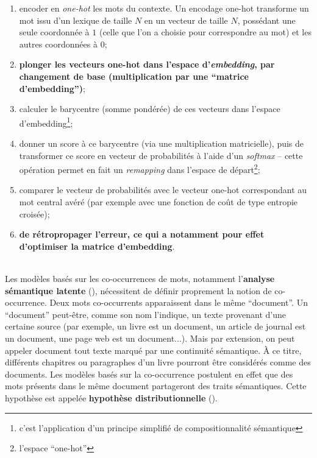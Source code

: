 \documentclass[french]{article}
\begin{document}
				\begin{enumerate}[label=(\roman*)]
					\item encoder en \textit{one-hot} les mots du contexte. Un encodage one-hot transforme un mot issu d'un lexique de taille $N$ en un vecteur de taille $N$, possédant une seule coordonnée à $1$ (celle que l'on a choisie pour correspondre au mot) et les autres coordonnées à $0$;
					\item \textbf{plonger les vecteurs one-hot dans l'espace d'\textit{embedding}, par changement de base (multiplication par une ``matrice d'embedding'')};
					\item calculer le barycentre (somme pondérée) de ces vecteurs dans l'espace d'embedding\footnote{c'est l'application d'un principe simplifié de compositionnalité sémantique};
					\item donner un score à ce barycentre (via une multiplication matricielle), puis de transformer ce score en vecteur de probabilités à l'aide d'un \textit{softmax} -- cette opération permet en fait un \textit{remapping} dans l'espace de départ\footnote{l'espace ``one-hot''};
					\item comparer le vecteur de probabilités avec le vecteur one-hot correspondant au mot central avéré (par exemple avec une fonction de coût de type entropie croisée);
					\item \textbf{de rétropropager l'erreur, ce qui a notamment pour effet d'optimiser la matrice d'embedding}.
				\end{enumerate}~\\
			
			
			Les modèles basés sur les co-occurrences de mots, notamment l'\textbf{analyse sémantique latente} (\cite{landauer1997,deerwester1990}), nécessitent de définir proprement la notion de co-occurrence. Deux mots co-occurrents apparaissent dans le même ``document''. Un ``document'' peut-être, comme son nom l'indique, un texte provenant d'une certaine source (par exemple, un livre est un document, un article de journal est un document, une page web est un document...). Mais par extension, on peut appeler document tout texte marqué par une continuité sémantique. À ce titre, différents chapitres ou paragraphes d'un livre pourront être considérés comme des documents. Les modèles basés sur la co-occurrence postulent en effet que des mots présents dans le même document partageront des traits sémantiques. Cette hypothèse est appelée \textbf{hypothèse distributionnelle} (\cite{erk2012}).\\
			
\end{document}
